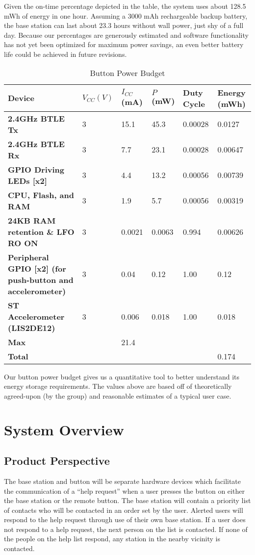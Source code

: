 \documentclass[journal]{IEEEtran}
\begin{document}
Given the on-time percentage depicted in the table, the system uses about 128.5 mWh of energy in one hour. Assuming a 3000 mAh rechargeable backup battery, the base station can last about 23.3 hours without wall power, just shy of a full day. Because our percentages are generously estimated and software functionality has not yet been optimized for maximum power savings, an even better battery life could be achieved in future revisions.

\begin{table*}[t]
  \centering
  \begin{tabular}{>{\bfseries}l|l l l l l}
    Device & $V_{CC} (V)$ & $I_{CC}$ (mA) & $P$ (mW) & Duty Cycle & Energy (mWh) \\
    \hline
    2.4GHz BTLE Tx & 3 & 15.1 & 45.3 & 0.00028 & 0.0127 \\
    2.4GHz BTLE Rx & 3 & 7.7 & 23.1 & 0.00028 & 0.00647 \\
    GPIO Driving LEDs [x2] & 3 & 4.4 & 13.2 & 0.00056 & 0.00739 \\
    CPU, Flash, and RAM & 3 & 1.9 & 5.7 & 0.00056 & 0.00319 \\
    24KB RAM retention \& LFO RO ON & 3 & 0.0021 & 0.0063 & 0.994 & 0.00626 \\
    Peripheral GPIO [x2] (for push-button and accelerometer) & 3 & 0.04 & 0.12 & 1.00 & 0.12 \\
    ST Accelerometer (LIS2DE12) & 3 & 0.006 & 0.018 & 1.00 & 0.018 \\
    \hline
    Max & & 21.4 & & & \\
    Total & & & & & 0.174
  \end{tabular}
  \caption{Button Power Budget}
\end{table*}

Our button power budget gives us a quantitative tool to better understand its energy storage requirements.  The values above are based off of theoretically agreed-upon (by the group) and reasonable estimates of a typical user case.

\section{System Overview}

\subsection{Product Perspective}
The base station and button will be separate hardware devices which facilitate the communication of a “help request” when a user presses the button on either the base station or the remote button.  The base station will contain a priority list of contacts who will be contacted in an order set by the user.  Alerted users will respond to the help request through use of their own base station.  If a user does not respond to a help request, the next person on the list is contacted.  If none of the people on the help list respond, any station in the nearby vicinity is contacted.
\end{document}
